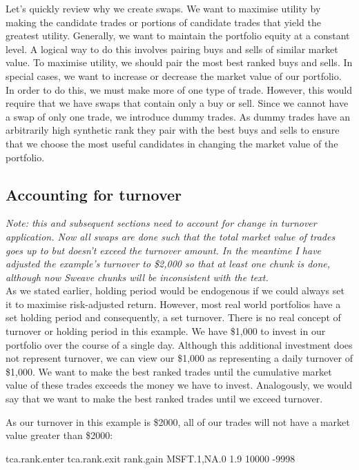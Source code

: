 \documentclass{article}
\begin{document}
Let's quickly review why we create swaps.  We want to maximise utility
by making the candidate trades or portions of candidate trades that
yield the greatest  utility.  Generally, we want to maintain
the portfolio equity at a constant level.  A logical way to do this
involves pairing buys and sells of similar market value.  To maximise
utility, we should pair the most best ranked buys and sells.  In
special cases, we want to increase or decrease the market value
of our portfolio.  In order to do this, we must make more of one type
of trade.  However, this would require that we have swaps that contain
only a buy or sell.  Since we cannot have a swap of only one trade, we
introduce dummy trades.  As dummy trades have an arbitrarily high
synthetic rank they pair with the best buys and sells to ensure that
we choose the most useful candidates in changing the market value of
the portfolio.

\subsection{Accounting for turnover}

\emph{Note: this and subsequent sections need to account
  for change in turnover application.  Now all swaps are done such
  that the total market value of trades goes up to but doesn't exceed
  the turnover amount.  In the meantime I have adjusted the example's
  turnover to \$2,000 so that at least one chunk is done, although now
  Sweave chunks will be inconsistent with the text.}
\\

As we stated earlier, holding period would be endogenous if
we could always set it to maximise risk-adjusted return.  However,
most real world portfolios have a set holding period and consequently,
a set turnover.  There is no real concept of turnover or holding
period in this example.  We have \$1,000 to invest in our portfolio
over the course of a single day.  Although this additional investment
does not represent turnover, we can view our \$1,000 as representing a
daily turnover of \$1,000.  We want to make the best ranked trades
until the cumulative market value of these trades exceeds the money we
have to invest.  Analogously, we would say that we want to make the
best ranked trades until we exceed turnover.

As our turnover in this example is \$2000, all of our
trades will not have a market value greater than
\$2000:

\begin{Schunk}
\begin{Soutput}
            tca.rank.enter tca.rank.exit rank.gain
MSFT.1,NA.0            1.9         10000     -9998
\end{Soutput}
\end{Schunk}
\end{document}

